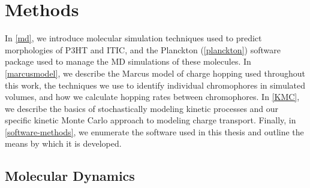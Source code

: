 \chapter{Methods}
\label{methods}



In \autoref{md}, we introduce molecular simulation techniques used to predict morphologies of P3HT and ITIC, and the Planckton (\autoref{planckton}) software package used to manage the MD simulations of these molecules. 
In \autoref{marcusmodel}, we describe the Marcus model of charge hopping used throughout this work, the techniques we use to identify individual chromophores in simulated volumes, and how we calculate hopping rates between chromophores.
In \autoref{KMC}, we describe the basics of stochastically modeling kinetic processes and our specific kinetic Monte Carlo approach to modeling charge transport.
Finally, in \autoref{software-methods}, we enumerate the software used in this thesis and outline the means by
which it is developed. 
 

\section{Molecular Dynamics}
\label{md}

